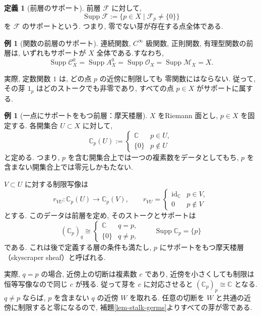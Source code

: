 \documentclass[dvipdfmx,a4paper,11pt]{article} %
\newcommand{\C}{\mathbb{C}}
\theoremstyle{definition}
\numberwithin{equation}{section}
\newtheorem{dfn}[thm]{定義}
\newtheorem{exa}[thm]{例}
\begin{document}
\begin{dfn}[前層のサポート]\label{O-M180}
前層 $\mathcal F$ に対して, 
\[
\operatorname{Supp}\mathcal F
:=\{p\in X\mid\mathcal F_p\neq\{0\}\}
\]
を $\mathcal F$ のサポートという.
つまり, 零でない芽が存在する点全体である.
\end{dfn}


\begin{exa}[関数の前層のサポート]
連続関数, $C^\infty$ 級関数, 正則関数, 有理型関数の前層は, 
いずれもサポートが $X$ 全体である.すなわち, 
\[
\operatorname{Supp}\mathcal C_X^0
=\operatorname{Supp}A_X^0
=\operatorname{Supp}\mathcal O_X
=\operatorname{Supp}\mathcal M_X
=X.
\]

実際, 定数関数 $1$ は, どの点 $p$ の近傍に制限しても
零関数にはならない.
従って, その芽 $1_p$ はどのストークでも非零であり, 
すべての点 $p\in X$ がサポートに属する.
\end{exa}

\begin{exa}[一点にサポートをもつ前層：摩天楼層]\label{O-M186}
$X$ をRiemann 面とし, $p\in X$ を固定する.
各開集合 $U\subset X$ に対して, 
\[
\C_p(U):=
\begin{cases}
\C & p\in U,\\
\{0\} & p\notin U
\end{cases}
\]
と定める.
つまり, $p$ を含む開集合上では一つの複素数をデータとしてもち, 
$p$ を含まない開集合上では零元しかもたない.

$V\subset U$ に対する制限写像は
\[
r_{VU}:\C_p(U)\longrightarrow\C_p(V),\qquad
r_{VU}=
\begin{cases}
\mathrm{id}_{\C} & p\in V,\\
0 & p\notin V
\end{cases}
\]
とする.
このデータは前層を定め, そのストークとサポートは
\[
(\C_p)_q\cong
\begin{cases}
\C & q=p,\\
\{0\} & q\neq p,
\end{cases}
\qquad
\operatorname{Supp}\C_p=\{p\}
\]
である.
これは後で定義する層の条件も満たし, 
$p$ にサポートをもつ摩天楼層
（skyscraper sheaf）と呼ばれる.

実際, $q=p$ の場合, 近傍上の切断は複素数 $c$ であり,
近傍を小さくしても制限は恒等写像なので同じ $c$ が残る.
従って芽を $c$ に対応させると $(\C_p)_p\cong\C$ となる.
$q\neq p$ ならば, $p$ を含まない $q$ の近傍 $W$ を取れる.
任意の切断を $W$ と共通の近傍に制限すると零になるので,
補題\ref{lem-stalk-germs}よりすべての芽が零である.

\end{exa}
\end{document}
